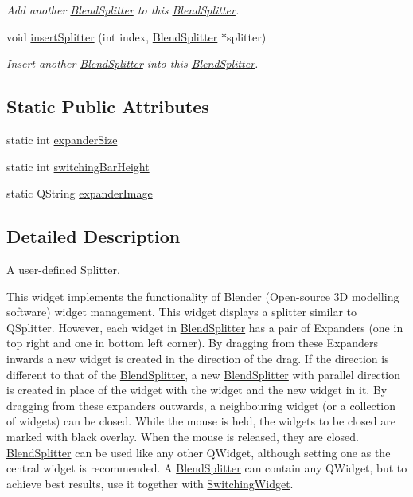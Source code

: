 \begin{DoxyCompactItemize}
\begin{DoxyCompactList}\small\item\em Add another \hyperlink{class_blend_splitter}{Blend\+Splitter} to this \hyperlink{class_blend_splitter}{Blend\+Splitter}. \end{DoxyCompactList}\item 
void \hyperlink{class_blend_splitter_a5e1adaac62d47cc3815835e713373e2b}{insert\+Splitter} (int index, \hyperlink{class_blend_splitter}{Blend\+Splitter} $\ast$splitter)
\begin{DoxyCompactList}\small\item\em Insert another \hyperlink{class_blend_splitter}{Blend\+Splitter} into this \hyperlink{class_blend_splitter}{Blend\+Splitter}. \end{DoxyCompactList}\end{DoxyCompactItemize}
\subsection*{Static Public Attributes}
\begin{DoxyCompactItemize}
\item 
static int \hyperlink{class_blend_splitter_a233a45efce9417f826d76ce54d832d50}{expander\+Size}
\item 
static int \hyperlink{class_blend_splitter_a478fa3cfcf59f76edf8f021bee297e0d}{switching\+Bar\+Height}
\item 
static Q\+String \hyperlink{class_blend_splitter_a38c7ab0fb471718aca5eb3fe09aa124b}{expander\+Image}
\end{DoxyCompactItemize}


\subsection{Detailed Description}
A user-\/defined Splitter. 

This widget implements the functionality of Blender (Open-\/source 3D modelling software) widget management. This widget displays a splitter similar to Q\+Splitter. However, each widget in \hyperlink{class_blend_splitter}{Blend\+Splitter} has a pair of Expanders (one in top right and one in bottom left corner). By dragging from these Expanders inwards a new widget is created in the direction of the drag. If the direction is different to that of the \hyperlink{class_blend_splitter}{Blend\+Splitter}, a new \hyperlink{class_blend_splitter}{Blend\+Splitter} with parallel direction is created in place of the widget with the widget and the new widget in it. By dragging from these expanders outwards, a neighbouring widget (or a collection of widgets) can be closed. While the mouse is held, the widgets to be closed are marked with black overlay. When the mouse is released, they are closed. \hyperlink{class_blend_splitter}{Blend\+Splitter} can be used like any other Q\+Widget, although setting one as the central widget is recommended. A \hyperlink{class_blend_splitter}{Blend\+Splitter} can contain any Q\+Widget, but to achieve best results, use it together with \hyperlink{class_switching_widget}{Switching\+Widget}.

